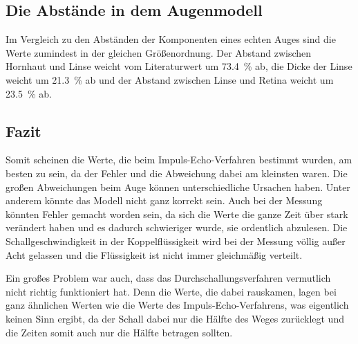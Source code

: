 \subsection{Die Abstände in dem Augenmodell}
Im Vergleich zu den Abständen der Komponenten eines echten Auges sind die Werte zumindest in der gleichen Größenordnung. 
Der Abstand zwischen Hornhaut und Linse weicht vom Literaturwert um \SI{73.4}{\percent} ab, die Dicke der Linse weicht um \SI{21.3}{\percent} 
ab und der Abstand zwischen Linse und Retina weicht um \SI{23.5}{\percent} ab.
\subsection{Fazit}
Somit scheinen die Werte, die beim Impuls-Echo-Verfahren bestimmt wurden, am besten zu sein, da der Fehler und die Abweichung dabei am kleinsten waren. 
Die großen Abweichungen beim Auge können unterschiedliche Ursachen haben. Unter anderem könnte das Modell nicht ganz korrekt sein. Auch bei der 
Messung könnten Fehler gemacht worden sein, da sich die Werte die ganze Zeit über stark verändert haben und es dadurch schwieriger wurde, sie ordentlich abzulesen.
Die Schallgeschwindigkeit in der Koppelflüssigkeit wird bei der Messung völlig außer Acht gelassen und die Flüssigkeit ist nicht 
immer gleichmäßig verteilt.

\noindent Ein großes Problem war auch, dass das Durchschallungsverfahren vermutlich nicht richtig funktioniert hat. Denn die Werte, die dabei rauskamen, lagen bei ganz 
ähnlichen Werten wie die Werte des Impuls-Echo-Verfahrens, was eigentlich keinen Sinn ergibt, da der Schall dabei nur die Hälfte des Weges zurücklegt 
und die Zeiten somit auch nur die Hälfte betragen sollten. 

\newpage